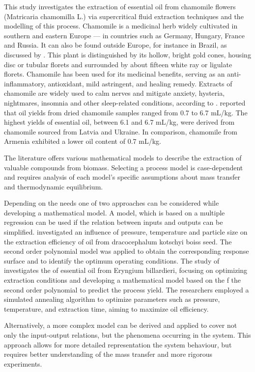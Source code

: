\documentclass[a4paper,fleqn]{cas-dc}
\begin{document}
	This study investigates the extraction of essential oil from chamomile flowers (Matricaria chamomilla L.) via supercritical fluid extraction techniques and the modelling of this process. Chamomile is a medicinal herb widely cultivated in southern and eastern Europe — in countries such as Germany, Hungary, France and Russia. It can also be found outside Europe, for instance in Brazil, as discussed by \citet{Singh2011}. This plant is distinguished by its hollow, bright gold cones, housing disc or tubular florets and surrounded by about fifteen white ray or ligulate florets. Chamomile has been used for its medicinal benefits, serving as an anti-inflammatory, antioxidant, mild astringent, and healing remedy. Extracts of chamomile are widely used to calm nerves and mitigate anxiety, hysteria, nightmares, insomnia and other sleep-related conditions, according to \citet{Srivastava2009}. \citet{Orav2010} reported that oil yields from dried chamomile samples ranged from 0.7 to 6.7 mL/kg. The highest yields of essential oil, between 6.1 and 6.7 mL/kg, were derived from chamomile sourced from Latvia and Ukraine. In comparison, chamomile from Armenia exhibited a lower oil content of 0.7 mL/kg.
	
	The literature offers various mathematical models to describe the extraction of valuable compounds from biomass. Selecting a process model is case-dependent and requires analysis of each model's specific assumptions about mass transfer and thermodynamic equilibrium.
	
	{\color{blue}Depending on the needs one of two approaches can be considered while developing a mathematical model. A model, which is based on a multiple regression can be used if the relation between inputs and outputs can be simplified. \citet{Sodeifian2017a} investigated an influence of pressure, temperature and particle size on the extraction efficiency of oil from dracocephalum kotschyi boiss seed. The second order polynomial model was applied to obtain the corresponding response surface and to identify the optimum operating conditions. 
	The study of \citet{Sodeifian2017b} investigates the of essential oil from Eryngium billardieri, focusing on optimizing extraction conditions and developing a mathematical model based on the f the second order polynomial to predict the process yield. The researchers employed a simulated annealing algorithm to optimize parameters such as pressure, temperature, and extraction time, aiming to maximize oil efficiency.
	
	Alternatively, a more complex model can be derived and applied to cover not only the input-output relations, but the phenomena occurring in the system. This approach allows for more detailed representation the system behaviour, but requires better understanding of the mass transfer and more rigorous experiments.}
	
\end{document}
